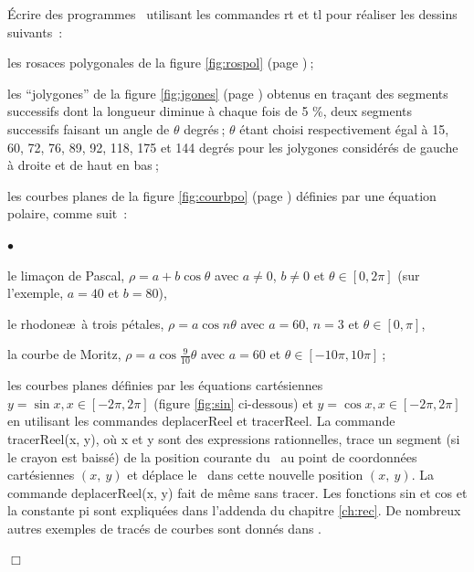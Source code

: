 \begin{exercices}{Écrire des programmes \python\  utilisant les commandes {\idt rt}
et {\idt tl} pour réaliser les dessins suivants~:

\tiret les rosaces polygonales de la figure \ref{fig:rospol} (page \pageref{fig:rospol})$\:$;

\tiret les ``jolygones'' de la figure \ref{fig:jgones} (page \pageref{fig:jgones}) obtenus en traçant des
segments successifs dont la longueur diminue à chaque fois de 5 \%, deux segments successifs faisant
un angle de $\theta$ degrés$\:$; $\theta$ étant choisi respectivement égal à 15, 60, 72, 76, 89, 92,
118, 175 et 144 degrés
pour les jolygones 
considérés de gauche
à droite et de haut en bas$\:$;

\tiret les courbes planes de la figure \ref{fig:courbpo} (page \pageref{fig:courbpo})
définies par une équation polaire, comme suit~:
 \begin{list}{$\scriptscriptstyle\bullet$}{
}
   \item le limaçon de Pascal, $\rho = a + b \cos{\theta}$ avec
   $a \neq 0$, $b \neq 0$ et $\theta \in [0, 2\pi]$ (sur l'exemple, $a = 40$ et $b = 80$),
   \item le rhodone\ae\ à trois pétales, $\rho = a \cos{n \theta}$ avec 
    $a = 60$, $n = 3$ et $\theta \in [0, \pi]$,
   \item la courbe de Moritz, $\rho = a \cos{\frac{9}{10} \theta}$ avec 
    $a = 60$ et $\theta \in [-10 \pi, 10 \pi]$$\:$;
   \end{list}

\tiret les courbes planes définies par les équations cartésiennes $y = \sin{x}, x \in [-2\pi, 2\pi]$
  (figure \ref{fig:sin} ci-dessous) et  $y = \cos{x}, x \in [-2\pi, 2\pi]$ en utilisant les commandes {\idt deplacerReel} 
  et {\idt tracerReel}. La commande {\idt tracerReel(x, y)},
  où {\idt x} et {\idt y} sont des expressions rationnelles,
  trace un segment (si le crayon est baissé) de la position courante du
  \robot\ au point de coordonnées cartésiennes $(x,\ y)$ et déplace le \robot\ dans
  cette nouvelle position  $(x,\ y)$. La commande {\idt deplacerReel(x, y)} fait de
  même sans tracer. Les fonctions {\idt sin} et {\idt cos} et la constante {\idt pi}
  sont expliquées dans l'addenda du chapitre \ref{ch:rec}.
   De nombreux autres exemples de tracés de courbes sont donnés dans \cite{LT}.

\noindent $\Box$}\end{exercices}
